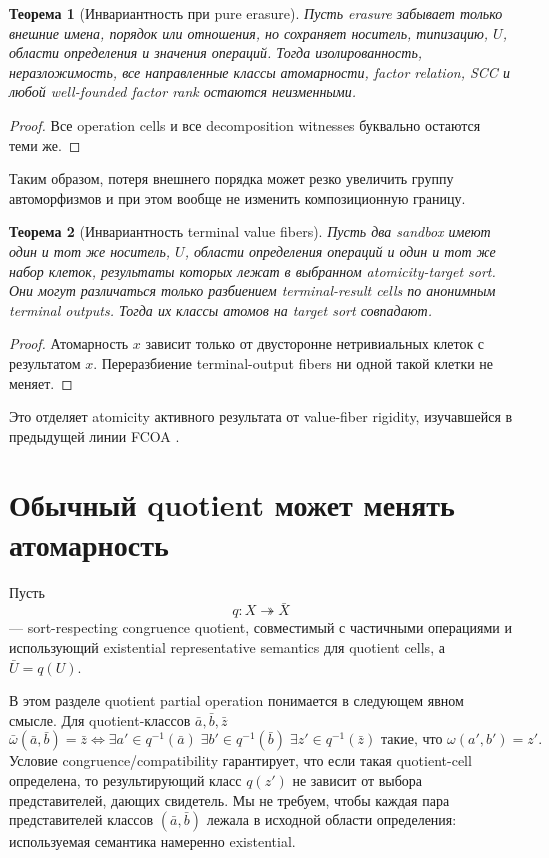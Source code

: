 \documentclass[11pt]{article}
\newtheorem{theorem}{Теорема}[section]
\theoremstyle{definition}
\theoremstyle{remark}
\begin{document}
\begin{theorem}[Инвариантность при pure erasure]
Пусть erasure забывает только внешние имена, порядок или отношения, но сохраняет носитель, типизацию, \(U\), области определения и значения операций. Тогда изолированность, неразложимость, все направленные классы атомарности, factor relation, SCC и любой well-founded factor rank остаются неизменными.
\end{theorem}

\begin{proof}
Все operation cells и все decomposition witnesses буквально остаются теми же.
\end{proof}

Таким образом, потеря внешнего порядка может резко увеличить группу автоморфизмов и при этом вообще не изменить композиционную границу.

\begin{theorem}[Инвариантность terminal value fibers]
Пусть два sandbox имеют один и тот же носитель, \(U\), области определения операций и один и тот же набор клеток, результаты которых лежат в выбранном atomicity-target sort. Они могут различаться только разбиением terminal-result cells по анонимным terminal outputs. Тогда их классы атомов на target sort совпадают.
\end{theorem}

\begin{proof}
Атомарность \(x\) зависит только от двусторонне нетривиальных клеток с результатом \(x\). Переразбиение terminal-output fibers ни одной такой клетки не меняет.
\end{proof}

Это отделяет atomicity активного результата от value-fiber rigidity, изучавшейся в предыдущей линии FCOA \cite{MalachevskyFCOA2026}.

\section{Обычный quotient может менять атомарность}

Пусть
\[
q:X\twoheadrightarrow\bar X
\]
— sort-respecting congruence quotient, совместимый с частичными операциями и использующий existential representative semantics для quotient cells, а \(\bar U=q(U)\).

В этом разделе quotient partial operation понимается в следующем явном смысле. Для quotient-классов \(\bar a,\bar b,\bar z\)
\begin{equation}
\boxed{
\bar\omega(\bar a,\bar b)=\bar z
\iff
\exists a'\in q^{-1}(\bar a)\;\exists b'\in q^{-1}(\bar b)\;\exists z'\in q^{-1}(\bar z)
\text{ такие, что }\omega(a',b')=z'.}
\label{eq:quotsem}
\end{equation}
Условие congruence/compatibility гарантирует, что если такая quotient-cell определена, то результирующий класс \(q(z')\) не зависит от выбора представителей, дающих свидетель. Мы не требуем, чтобы каждая пара представителей классов \((\bar a,\bar b)\) лежала в исходной области определения: используемая семантика намеренно existential.
\end{document}
